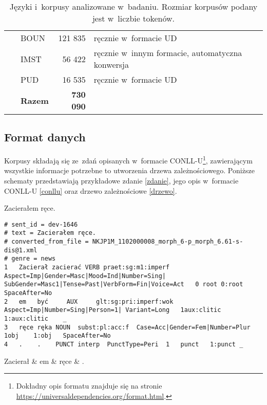 \begin{table}[!h]
\begin{tabular}{llrl}
        ~ & BOUN & 121 835 & ręcznie w~formacie UD \\
        ~ & IMST & 56 422 & ręcznie w~innym formacie, automatyczna konwersja \\
        ~ & PUD & 16 535 & ręcznie w~formacie UD \\ 
        ~ & \textbf{Razem} & \textbf{730 090} \\ 
    \bottomrule
    \end{tabular}
    \caption{Języki i~korpusy analizowane w~badaniu. Rozmiar korpusów podany jest w~liczbie tokenów.}
   	\label{korpusy}
\end{table}

\FloatBarrier
\newpage
\subsection{Format danych}

Korpusy składają się ze~zdań opisanych w~formacie CONLL-U\footnote{Dokładny opis formatu znajduje się na stronie \url{https://universaldependencies.org/format.html}.}, zawierającym wszystkie informacje potrzebne to utworzenia drzewa zależnościowego. Poniższe schematy przedstawiają przykładowe zdanie \eqref{zdanie}, jego opis w~formacie CONLL-U \eqref{conllu} oraz drzewo zależnościowe \eqref{drzewo}.

\begin{exe}
\ex \label{zdanie} Zacierałem ręce.

\vspace{0.5cm}

\ex  \label{conllu}
\begin{scriptsize}
\begin{verbatim}
# sent_id = dev-1646 
# text = Zacierałem ręce.
# converted_from_file = NKJP1M_1102000008_morph_6-p_morph_6.61-s-dis@1.xml
# genre = news
1	Zacierał zacierać VERB praet:sg:m1:imperf	Aspect=Imp|Gender=Masc|Mood=Ind|Number=Sing|
SubGender=Masc1|Tense=Past|VerbForm=Fin|Voice=Act	0 root 0:root SpaceAfter=No
2	em	 być	 AUX	 glt:sg:pri:imperf:wok	Aspect=Imp|Number=Sing|Person=1| Variant=Long	1aux:clitic
1:aux:clitic	_
3	ręce ręka NOUN	subst:pl:acc:f	Case=Acc|Gender=Fem|Number=Plur	1obj	1:obj	SpaceAfter=No
4	.    .    PUNCT	interp	PunctType=Peri	1	punct	1:punct	_
\end{verbatim}
\end{scriptsize}

\vspace{0.5cm}

\ex \label{drzewo}
\begin{dependency}[baseline=-\the\dimexpr\fontdimen22\textfont2\relax]
\begin{deptext}[column sep=1em]
Zacierał \& em \& ręce \& .  \\ 
\end{deptext}
\end{dependency}
\citep{przepiorkowski2018lexical}
\end{exe} 

